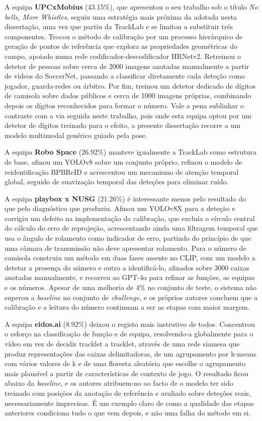 A equipa \textbf{UPCxMobius} (43.15\%), que apresentou o seu trabalho sob o título
\emph{No bells, More Whistles}, seguiu uma estratégia mais próxima da adotada nesta
dissertação, uma vez que partiu da TrackLab e se limitou a substituir três componentes.
Trocou o método de calibração por um processo hierárquico de geração de pontos de
referência que explora as propriedades geométricas do campo, apoiado numa rede
codificador-descodificador HRNetv2. Retreinou o detetor de pessoas sobre cerca de 2000
imagens anotadas manualmente a partir de vídeos do SoccerNet, passando a classificar
diretamente cada deteção como jogador, guarda-redes ou árbitro. Por fim, treinou um
detetor dedicado de dígitos de camisola sobre dados públicos e cerca de 1000 imagens
próprias, combinando depois os dígitos reconhecidos para formar o número. Vale a pena
sublinhar o contraste com a via seguida neste trabalho, pois onde esta equipa optou por
um detetor de dígitos treinado para o efeito, a presente dissertação recorre a um modelo
multimodal genérico guiado pela pose.

A equipa \textbf{Robo Space} (26.92\%) manteve igualmente a TrackLab como estrutura de
base, afinou um YOLOv8 sobre um conjunto próprio, refinou o modelo de reidentificação
BPBReID e acrescentou um mecanismo de atenção temporal global, seguido de suavização
temporal das deteções para eliminar ruído.

A equipa \textbf{playbox x NUSG} (21.26\%) é interessante menos pelo resultado do que
pelo diagnóstico que produziu. Afinou um YOLOv8X para a deteção e corrigiu um defeito na
implementação da calibração, que excluía o círculo central do cálculo do erro de
reprojeção, acrescentando ainda uma filtragem temporal que usa o ângulo de rolamento como
indicador de erro, partindo do princípio de que uma câmara de transmissão não deve
apresentar rolamento. Para o número de camisola construiu um método em duas fases assente
no CLIP, com um modelo a detetar a presença do número e outro a identificá-lo, afinados
sobre 3000 caixas anotadas manualmente, e recorreu ao GPT-4o para refinar as funções, as
equipas e os números. Apesar de uma melhoria de 4\% no conjunto de teste, o sistema não
superou a \emph{baseline} no conjunto de \emph{challenge}, e os próprios autores concluem
que a calibração e a leitura do número continuam a ser as etapas com maior margem.

A equipa \textbf{eidos.ai} (8.92\%) deixou o registo mais instrutivo de todos. Concentrou
o esforço na classificação de função e de equipa, resolvendo-a globalmente para o vídeo em
vez de decidir tracklet a tracklet, através de uma rede siamesa que produz representações
das caixas delimitadoras, de um agrupamento por k-means com vários valores de k e de uma
floresta aleatória que escolhe o agrupamento mais plausível a partir de características de
contexto de jogo. O resultado ficou abaixo da \emph{baseline}, e os autores atribuem-no ao
facto de o modelo ter sido treinado com posições da anotação de referência e avaliado sobre
deteções reais, necessariamente imprecisas. É um exemplo claro de como a qualidade das
etapas anteriores condiciona tudo o que vem depois, e não uma falha do método em si.

